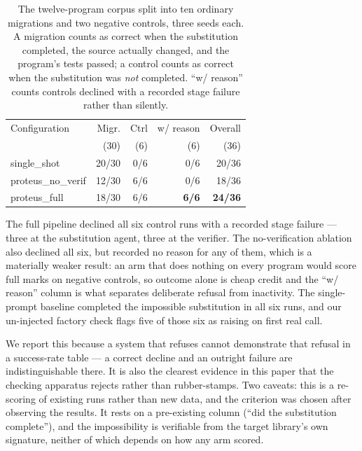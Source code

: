 \documentclass[10pt,twocolumn]{article}
\begin{document}
\begin{table}[t]
\centering
\caption{The twelve-program corpus split into ten ordinary migrations and two
negative controls, three seeds each. A migration counts as correct when the
substitution completed, the source actually changed, and the program's tests
passed; a control counts as correct when the substitution was \emph{not}
completed. ``w/ reason'' counts controls declined with a recorded stage
failure rather than silently.}
\label{tab:controls}
\small
\setlength{\tabcolsep}{4pt}
\begin{tabular}{lrrrr}
\toprule
Configuration & Migr. & Ctrl & w/ reason & Overall \\
              & (30)  & (6)  & (6)       & (36) \\
\midrule
single\_shot      & 20/30 & 0/6 & 0/6 & 20/36 \\
proteus\_no\_verif & 12/30 & 6/6 & 0/6 & 18/36 \\
proteus\_full     & 18/30 & 6/6 & \textbf{6/6} & \textbf{24/36} \\
\bottomrule
\end{tabular}
\end{table}

The full pipeline declined all six control runs with a recorded stage failure
--- three at the substitution agent, three at the verifier. The
no-verification ablation also declined all six, but recorded no reason for any
of them, which is a materially weaker result: an arm that does nothing on every
program would score full marks on negative controls, so outcome alone is cheap
credit and the ``w/ reason'' column is what separates deliberate refusal from
inactivity. The single-prompt baseline completed the impossible substitution in
all six runs, and our un-injected factory check flags five of those six as
raising on first real call.

We report this because a system that refuses cannot demonstrate that refusal in
a success-rate table --- a correct decline and an outright failure are
indistinguishable there. It is also the clearest evidence in this paper that
the checking apparatus rejects rather than rubber-stamps. Two caveats: this is
a re-scoring of existing runs rather than new data, and the criterion was
chosen after observing the results. It rests on a pre-existing column
(``did the substitution complete''), and the impossibility is verifiable from
the target library's own signature, neither of which depends on how any arm
scored.
\end{document}
